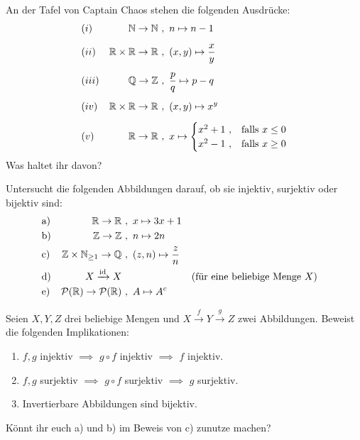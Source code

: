 \begin{aufg}[Wohldefiniertheit] \label{aufg:wohldef}
    An der Tafel von Captain Chaos stehen die folgenden Ausdrücke:
    \begin{align*}
        & (i) & \mathbb N \to \mathbb N\ &,\ n \mapsto n-1 \\[0.5em]
        & (ii) & \mathbb R\times \mathbb R \to \mathbb R \ &,\ (x,y) \mapsto \frac{x}{y} \\[0.5em]
        & (iii) & \mathbb Q \to \mathbb Z \ &,\ \frac{p}{q} \mapsto p-q \\[0.5em]
        & (iv) & \mathbb R \times \mathbb R \to \mathbb R \ &,\ (x,y) \mapsto x^y \\[0.5em]
        & (v) & \mathbb R \to \mathbb R \ &,\ x \mapsto \begin{cases}
            x^2+1\ , & \text{falls}\ x \le 0 \\
            x^2-1\ , & \text{falls}\ x\ge 0
        \end{cases}
    \end{align*}
    Was haltet ihr davon?
\end{aufg}


\begin{aufg}
    Untersucht die folgenden Abbildungen darauf, ob sie injektiv, surjektiv oder bijektiv sind:
    \begin{align*}
        & \text{a)} & \mathbb R \to \mathbb R\ &,\ x\mapsto 3x+1 \\
        & \text{b)} & \mathbb Z \to \mathbb Z\ &,\ n\mapsto 2n \\
        & \text{c)} & \mathbb Z \times \mathbb N_{\ge 1} \to \mathbb Q\ &,\ (z,n) \mapsto \frac{z}{n} \\
        & \text{d)} & X\xrightarrow{\mathrm{id}} X\ & && (\text{für eine beliebige Menge $X$}) \\
        & \text{e)} & \mathcal P(\mathbb R) \to \mathcal P(\mathbb R) \ &,\ A \mapsto A^c
    \end{align*}
\end{aufg}


\begin{aufg} \label{aufg:bijektiviso}
    Seien $X,Y,Z$ drei beliebige Mengen und $X \xrightarrow{f} Y \xrightarrow{g} Z$ zwei Abbildungen. Beweist die folgenden Implikationen:
    \begin{enumerate}
        \item $f,g$ injektiv $\implies$ $g\circ f$ injektiv $\implies$ $f$ injektiv.
        \item $f,g$ surjektiv $\implies$ $g\circ f$ surjektiv $\implies$ $g$ surjektiv.
        \item Invertierbare Abbildungen sind bijektiv.
    \end{enumerate}
    Könnt ihr euch a) und b) im Beweis von c) zunutze machen?
\end{aufg}

